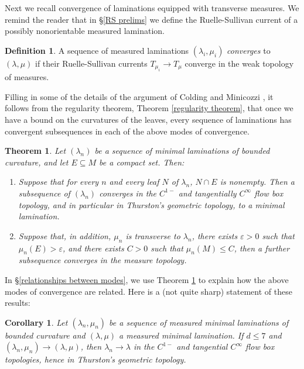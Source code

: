 \documentclass[reqno,11pt]{amsart}
\newcommand{\dfn}[1]{\emph{#1}\index{#1}}
\newtheorem{corollary}[theorem]{Corollary}
\newtheorem{mainthm}{Theorem}
\theoremstyle{definition}
\newtheorem{definition}[theorem]{Definition}
\numberwithin{equation}{section}
\begin{document}
Next we recall convergence of laminations equipped with transverse measures.
We remind the reader that in \S\ref{RS prelims} we define the Ruelle-Sullivan current of a possibly nonorientable measured lamination.

\begin{definition}
A sequence of measured laminations $(\lambda_i, \mu_i)$ \dfn{converges} to $(\lambda, \mu)$ if their Ruelle-Sullivan currents $T_{\mu_i} \to T_\mu$ converge in the weak topology of measures.
\end{definition}

Filling in some of the details of the argument of Colding and Minicozzi \cite[Appendix B]{ColdingMinicozziIV}, it follows from the regularity theorem, Theorem \ref{regularity theorem}, that once we have a bound on the curvatures of the leaves, every sequence of laminations has convergent subsequences in each of the above modes of convergence.

\begin{mainthm}\label{compactness theorem}
Let $(\lambda_n)$ be a sequence of minimal laminations of bounded curvature, and let $E \subseteq M$ be a compact set. Then:
\begin{enumerate}
\item Suppose that for every $n$ and every leaf $N$ of $\lambda_n$, $N \cap E$ is nonempty. Then a subsequence of $(\lambda_n)$ converges in the $C^{1-}$ and tangentially $C^\infty$ flow box topology, and in particular in Thurston's geometric topology, to a minimal lamination.
\item Suppose that, in addition, $\mu_n$ is transverse to $\lambda_n$, there exists $\varepsilon > 0$ such that $\mu_n(E) > \varepsilon$, and there exists $C > 0$ such that $\mu_n(M) \leq C$, then a further subsequence converges in the measure topology.
\end{enumerate}
\end{mainthm}

In \S\ref{relationships between modes}, we use Theorem \ref{compactness theorem} to explain how the above modes of convergence are related.
Here is a (not quite sharp) statement of these results:

\begin{corollary}
Let $(\lambda_n, \mu_n)$ be a sequence of measured minimal laminations of bounded curvature and $(\lambda, \mu)$ a measured minimal lamination.
If $d \leq 7$ and $(\lambda_n, \mu_n) \to (\lambda, \mu)$, then $\lambda_n \to \lambda$ in the $C^{1-}$ and tangential $C^\infty$ flow box topologies, hence in Thurston's geometric topology.
\end{corollary}
\end{document}
